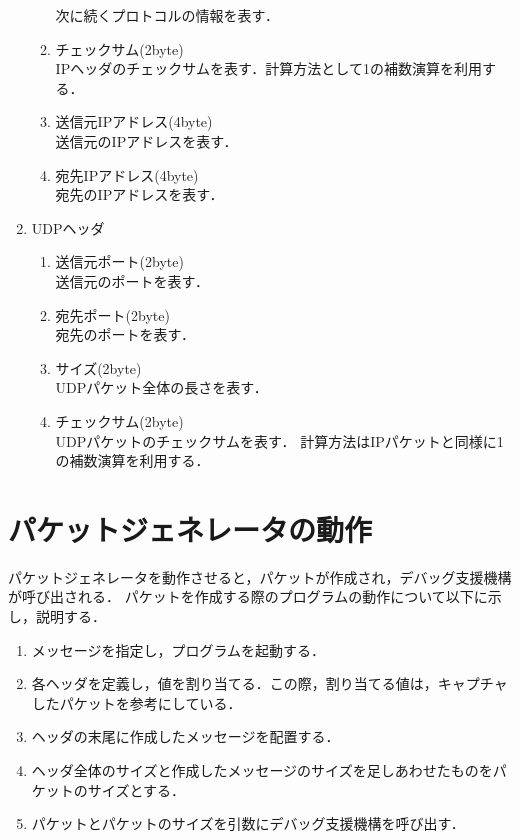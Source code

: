 \documentclass[12pt]{jsarticle}
\begin{document}
\begin{enumerate}
\begin{enumerate}
                次に続くプロトコルの情報を表す．
            \item チェックサム(2byte)\\
                IPヘッダのチェックサムを表す．計算方法として1の補数演算を利用する．
            \item 送信元IPアドレス(4byte)\\
                送信元のIPアドレスを表す．
            \item 宛先IPアドレス(4byte)\\
                宛先のIPアドレスを表す．
        \end{enumerate}
    \item UDPヘッダ
        \begin{enumerate}
            \item 送信元ポート(2byte)\\
                送信元のポートを表す．
            \item 宛先ポート(2byte)\\
                宛先のポートを表す．
            \item サイズ(2byte)\\
                UDPパケット全体の長さを表す．
            \item チェックサム(2byte)\\
                UDPパケットのチェックサムを表す．
                計算方法はIPパケットと同様に1の補数演算を利用する．
        \end{enumerate}
\end{enumerate}
\section{パケットジェネレータの動作}
パケットジェネレータを動作させると，パケットが作成され，デバッグ支援機構が呼び出される．
パケットを作成する際のプログラムの動作について以下に示し，説明する．
\begin{enumerate}
    \item メッセージを指定し，プログラムを起動する．
    \item 各ヘッダを定義し，値を割り当てる．この際，割り当てる値は，キャプチャしたパケットを参考にしている．
    \item ヘッダの末尾に作成したメッセージを配置する．
    \item ヘッダ全体のサイズと作成したメッセージのサイズを足しあわせたものをパケットのサイズとする．
    \item パケットとパケットのサイズを引数にデバッグ支援機構を呼び出す．
\end{enumerate}
\end{document}
